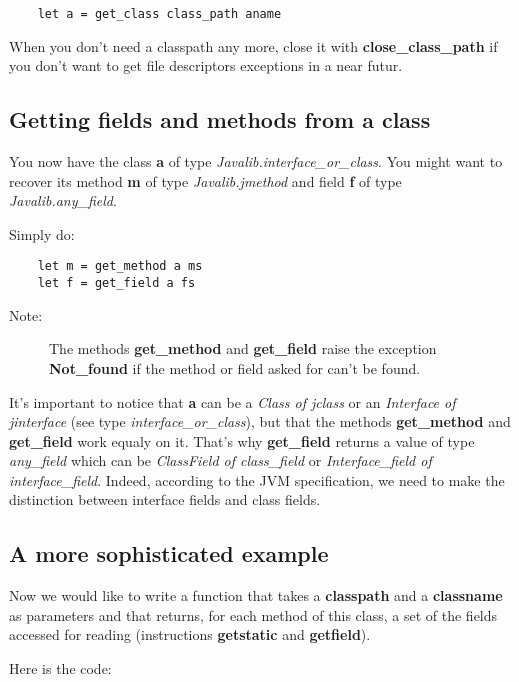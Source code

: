 \documentclass{article}
\begin{document}
\begin{verbatim}
    let a = get_class class_path aname
\end{verbatim}
When you don't need a classpath any more, close it with
\textbf{close\_class\_path} if you don't want to get file
descriptors exceptions in a near futur.

\subsection{Getting fields and methods from a class}

You now have the class \textbf{a} of type
\emph{Javalib.interface\_or\_class}. You might want to recover its
method \textbf{m} of type \emph{Javalib.jmethod} and field
\textbf{f} of type \emph{Javalib.any\_field}.

Simply do:

\begin{verbatim}
    let m = get_method a ms
    let f = get_field a fs
\end{verbatim}
\begin{description}
\item[Note:]
The methods \textbf{get\_method} and \textbf{get\_field} raise the
exception \textbf{Not\_found} if the method or field asked for
can't be found.
\end{description}
It's important to notice that \textbf{a} can be a
\emph{Class of jclass} or an \emph{Interface of jinterface} (see
type \emph{interface\_or\_class}), but that the methods
\textbf{get\_method} and \textbf{get\_field} work equaly on it.
That's why \textbf{get\_field} returns a value of type
\emph{any\_field} which can be \emph{ClassField of class\_field} or
\emph{Interface\_field of interface\_field}. Indeed, according to
the JVM specification, we need to make the distinction between
interface fields and class fields.

\subsection{A more sophisticated example}

Now we would like to write a function that takes a
\textbf{classpath} and a \textbf{classname} as parameters and that
returns, for each method of this class, a set of the fields
accessed for reading (instructions \textbf{getstatic} and
\textbf{getfield}).

Here is the code:
\end{document}
